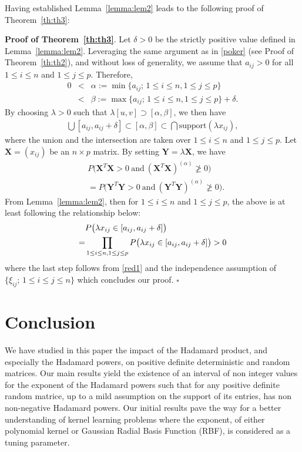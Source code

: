 \documentclass[conference,letterpaper]{IEEEtran}
\numberwithin{equation}{section}
\newcommand{\lbl}{\label}
\newcommand{\beaa}{\begin{eqnarray*}}
\newcommand{\eeaa}{\end{eqnarray*}}
\newcommand{\bea}{\begin{eqnarray}}
\newcommand{\eea}{\end{eqnarray}}
\begin{document}
\medskip



Having established Lemma~\ref{lemma:lem2} leads to the following proof of Theorem~\ref{th:th3}:

\noindent\textbf{Proof of Theorem~\ref{th:th3}}. Let $\delta >0$ be the strictly positive value defined in Lemma~\ref{lemma:lem2}. 
Leveraging the same argument as in \eqref{poker} (see Proof of Theorem~\ref{th:th2}), and without loss of generality, we assume that $a_{ij}>0$ for all $1\leq i\leq n$ and $1\leq j \leq p$. 
Therefore,
\beaa
0&<&\alpha:=\min\{a_{ij};\, 1\leq i \leq n, 1\leq j \leq p\}\\
&<& \beta:=\max\{a_{ij};\, 1\leq i\leq n, 1\leq j \leq p\}+\delta.
\eeaa
By choosing $\lambda>0$ such that $\lambda [u, v]\supset [\alpha , \beta]$, we then have
\bea\lbl{red1}
\bigcup [a_{ij}, a_{ij}+\delta] \subset [\alpha, \beta]\subset \bigcap   \mbox{support}(\lambda x_{ij}),
\eea
where the union and the intersection are taken over $1\leq i \leq n$ and $1\leq j \leq p.$ 
Let $\mathbf{X}=(x_{ij})$ be an $n\times p $ matrix.
By setting $\mathbf{Y}=\lambda\mathbf{X}$, we have
\beaa
& P\big(\mathbf{X}^T\mathbf{X}>0\ \mbox{and}\ (\mathbf{X}^T\mathbf{X})^{(\alpha)}\ngeqslant 0\big)\\
& =  P\big(\mathbf{Y}^T\mathbf{Y}>0\ \mbox{and}\ (\mathbf{Y}^T\mathbf{Y})^{(\alpha)}\ngeqslant 0\big).
\eeaa
From Lemma~\ref{lemma:lem2}, then for $1\leq i\leq n$ and $1\leq j \leq p$, the above is at least following the relationship below:
\begin{align}\notag
& P\big(\lambda x_{ij}\in [a_{ij}, a_{ij}+\delta]\big)\\ \notag
=& \prod_{1\leq i\leq n, 1\leq j \leq p}P\big(\lambda x_{ij}\in [a_{ij}, a_{ij}+\delta]\big)>0\notag
\end{align}
where the last step follows from \eqref{red1} and the independence assumption of $\{\xi_{ij};\, 1\leq i \leq j \leq n\}$ which concludes our proof. \hfill$\square$



\section{Conclusion}\lbl{sec:conclusion}

We have studied in this paper the impact of the Hadamard product, and especially the Hadamard powers, on positive definite deterministic and random matrices.
Our main results yield the existence of an interval of non integer values for the exponent of the Hadamard powers such that for any positive definite random matrice, up to a mild assumption on the support of its entries, has non non-negative Hadamard powers.
Our initial results pave the way for a better understanding of kernel learning problems where the exponent, of either polynomial kernel or Gaussian Radial Basis Function (RBF), is considered as a tuning parameter.
\end{document}
